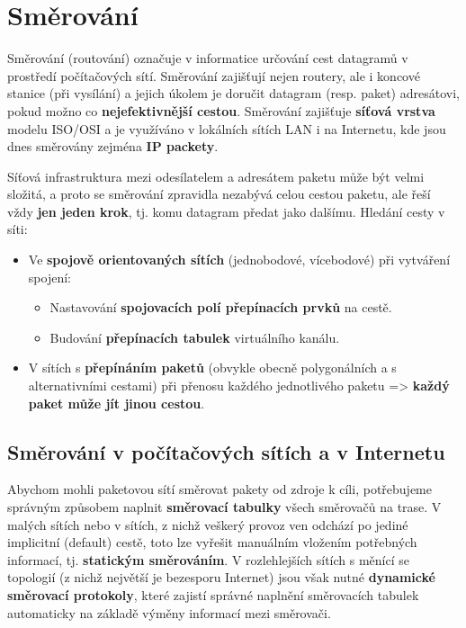 \section{Směrování}
Směrování (routování) označuje v informatice určování cest datagramů v prostředí počítačových sítí. Směrování zajišťují nejen routery, ale i koncové stanice (při vysílání) a jejich úkolem je doručit datagram (resp. paket) adresátovi, pokud možno co \textbf{nejefektivnější cestou}. Směrování zajišťuje \textbf{síťová vrstva} modelu ISO/OSI a je využíváno v lokálních sítích LAN i na Internetu, kde jsou dnes směrovány zejména \textbf{IP packety}.

Síťová infrastruktura mezi odesílatelem a adresátem paketu může být velmi složitá, a proto se směrování zpravidla nezabývá celou cestou paketu, ale řeší vždy \textbf{jen jeden krok}, tj. komu datagram předat jako dalšímu. Hledání cesty v síti:

\begin{itemize}
    \item Ve \textbf{spojově orientovaných sítích} (jednobodové, vícebodové) při vytváření spojení:
          \begin{itemize}
              \item Nastavování \textbf{spojovacích polí přepínacích prvků} na cestě.
              \item Budování \textbf{přepínacích tabulek} virtuálního kanálu.
          \end{itemize}
    \item V sítích s \textbf{přepínáním paketů} (obvykle obecně polygonálních a s alternativními cestami) při přenosu každého jednotlivého paketu => \textbf{každý paket může jít jinou cestou}.
\end{itemize}

\subsection{Směrování v počítačových sítích a v Internetu}
Abychom mohli paketovou sítí směrovat pakety od zdroje k cíli, potřebujeme správným způsobem naplnit \textbf{směrovací tabulky} všech směrovačů na trase. V malých sítích nebo v sítích, z nichž veškerý provoz ven odchází po jediné implicitní (default) cestě, toto lze vyřešit manuálním vložením potřebných informací, tj. \textbf{statickým směrováním}. V rozlehlejších sítích s měnící se topologií (z nichž největší je bezesporu Internet) jsou však nutné \textbf{dynamické směrovací protokoly}, které zajistí správné naplnění směrovacích tabulek automaticky na základě výměny informací mezi směrovači.

